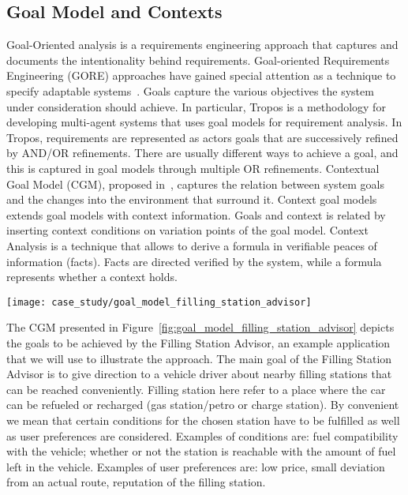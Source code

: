 
\subsection{Goal Model and Contexts}
Goal-Oriented analysis is a requirements engineering approach that captures and documents the intentionality behind requirements. Goal-oriented Requirements Engineering (GORE) approaches have gained special attention as a technique to specify adaptable systems~\cite{morandini_goal-oriented_2009}. Goals capture the various objectives the system under consideration should achieve. In particular, Tropos\cite{bresciani_tropos:_2004} is a methodology for developing multi-agent systems that uses goal models for requirement analysis. In Tropos, requirements are represented as actors goals that are successively refined by AND/OR refinements. There are usually different ways to achieve a goal, and this is captured in goal models through multiple OR refinements.
Contextual Goal Model (CGM), proposed in~\cite{ali_goal-based_2010}, captures the relation between system goals and the changes into the environment that surround it. Context goal models extends goal models with context information. Goals and context is related by inserting context conditions on variation points of the goal model. Context Analysis is a technique that allows to derive a formula in verifiable peaces of information (facts). Facts are directed verified by the system, while a formula represents whether a context holds.

\begin{figure*}[!htb]
 \centering
 \texttt{[image: case\_study/goal\_model\_filling\_station\_advisor]}
 \caption{CGM of the filling station advisor}
\label{fig:goal_model_filling_station_advisor}
\end{figure*}




The CGM presented in Figure~\ref{fig:goal_model_filling_station_advisor} depicts the goals to be achieved by the Filling Station Advisor, an example application that we will use to illustrate the approach.
The main goal of the Filling Station Advisor is to give direction to a vehicle driver about nearby filling stations that can be reached conveniently. Filling station here refer to a place where the car can be refueled or recharged (gas station/petro or charge station). By convenient we mean that certain conditions for the chosen station have to be fulfilled as well as user preferences are considered. Examples of conditions are: fuel compatibility with the vehicle; whether or not the station is reachable with the amount of fuel left in the vehicle. Examples of user preferences are: low price, small deviation from an actual route, reputation of the filling station.


